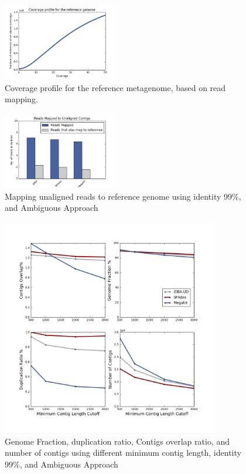 \documentclass[10pt,a4paper,twocolumn]{article}
\begin{document}

 
\begin{figure}[!h]
\centering
\includegraphics[width=0.45\textwidth]{CoverageProfile.png}  
\caption{\label{fig:coverage-profile} Coverage profile for the reference metagenome, based on read mapping. }
\end{figure}

\begin{figure}[!h]
\centering
\includegraphics[width=0.45\textwidth]{UnalignmentHistogram.png} %
\caption{Mapping unaligned reads to reference genome using identity 99\%, and Ambiguous Approach}
\label{fig:unaligned-reads}
\end{figure}

\begin{figure}[!ht]
\centering
\includegraphics[width=9.5cm,height=9.5cm]{min-contig-analysis.png}  
\caption{\label{fig:min-contig-analysis} Genome Fraction, duplication ratio, Contigs overlap ratio, and number of contigs using different minimum contig length,  identity 99\%, and Ambiguous Approach}
\end{figure}
\end{document}
